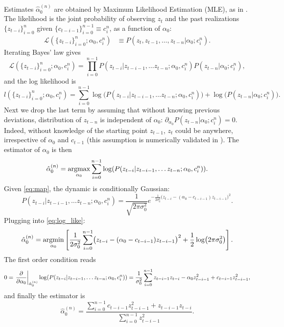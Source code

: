 \documentclass[FinalReport.tex]{subfiles}
\begin{document}
Estimates $\hat{\alpha}_0^{(n)}$ are obtained by Maximum Likelihood Estimation (MLE), as in \cite{OptCont}. The likelihood is the joint probability of observing $z_t$ and the past realizations $\{z_{t-i}\}_{i=0}^{n}$ given $\{c_{t-i-1}\}_{i=0}^{n-1}\equiv c_i^n$, as a function of $\alpha_0$:
\begin{align}
	\mathcal{L}(\{z_{t-i}\}_{i=0}^{n};\alpha_0,c_i^n)&\equiv P(z_t,z_{t-1},\dots,z_{t-n}\vert \alpha_0;c_i^n)\label{eq:mle}.
\end{align}
Iterating Bayes' law gives
\begin{equation}
	\mathcal{L}(\{z_{t-i}\}_{i=0}^{n};\alpha_0,c_i^n)=\prod_{i=0}^{n-1}P(z_{t-i}\vert z_{t-i-1},\dots z_{t-n};\alpha_0,c_i^n) P(z_{t-n}\vert \alpha_0;c_i^n),
\end{equation}
and the log likelihood is
\begin{equation}\label{eq:log_lik_full}
	l(\{z_{t-i}\}_{i=0}^{n};\alpha_0,c_i^n)=\sum_{i=0}^{n-1}\log\bigl(P(z_{t-i}\vert z_{t-i-1},\dots z_{t-n};\alpha_0,c_i^n)\bigr) + \log\bigl(P(z_{t-n}\vert \alpha_0;c_i^n)\bigr).
\end{equation}
Next we drop the last term by assuming that without knowing previous deviations, distribution of $z_{t-n}$ is independent of $\alpha_0$: $\partial_{\alpha_0}{P(z_{t-n}\vert \alpha_0;c_i^n)}=0$. Indeed, without knowledge of the starting point $z_{t-1}$, $z_t$ could be anywhere, irrespective of $\alpha_0$ and $c_{t-1}$ (this assumption is numerically validated in \cite{OptCont}). The estimator of $\alpha_0$ is then
\begin{equation}\label{eq:log_like}
	\hat{\alpha}_0^{(n)}=\operatorname*{argmax}_{\alpha_0}\sum_{i=0}^{n-1}\log(P(z_{t-i}\vert z_{t-i-1},\dots z_{t-n};\alpha_0,c_i^n)).
\end{equation}
Given \eqref{eq:map}, the dynamic is conditionally Gaussian:
\begin{equation}
	P(z_{t-i}\vert z_{t-i-1},\dots z_{t-n};\alpha_0,c_i^n)=\frac{1}{\sqrt{2\pi\sigma_0^2}}e^{-\frac{1}{2\sigma_0^2}\bigl(z_{t-i}-(\alpha_0-c_{t-i-1})z_{t-i-1}\bigr)^2}.
\end{equation}
Plugging into \eqref{eq:log_like}:
\begin{equation}
\hat{\alpha}_0^{(n)}=\operatorname*{argmin}_{\alpha_0}\left[\frac{1}{2\sigma_0^2}\sum_{i=0}^{n-1}\bigl(z_{t-i}-(\alpha_0-c_{t-i-1})z_{t-i-1}\bigr)^2 +\frac{1}{2}\log(2\pi\sigma_0^2)\right].
\end{equation}
The first order condition reads
\begin{equation}
0=\left.\pdv{}{\alpha_0}\right\vert_{\hat{\alpha}_0^{(n)}}\log(P(z_{t-i}\vert z_{t-i-1},\dots z_{t-n};\alpha_0,c_i^n))=\frac{1}{\sigma_0^2} \sum_{i=0}^{n-1} z_{t-i-1}z_{t-i}-\alpha_0z_{t-i-1}^2+c_{t-i-1}z_{t-i-1}^2,
\end{equation}
and finally the estimator is 
\begin{equation}\label{eq:controller_mle_n}
	\hat{\alpha}_0^{(n)}=\frac{\sum_{i=0}^{n-1}c_{t-i-1}z_{t-i-1}^2+z_{t-i-1}z_{t-i}}{\sum_{i=0}^{n-1}z_{t-i-1}^2}.
\end{equation}
\end{document}

